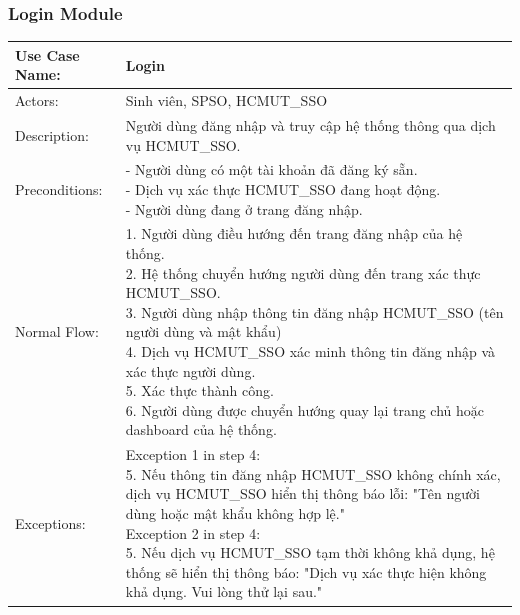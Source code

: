 \subsubsection{Login Module}
\begin{table}[h!]
	\centering
	\begin{tabular}{ |p{4cm}|p{3cm}|p{3cm}|p{3cm}|  }
		\hline
		Use Case Name:    & \multicolumn{3}{l|}{Login}                                                                         \\
		\hline
		Actors:           & \multicolumn{3}{p{10cm}|}{Sinh viên, SPSO, HCMUT\_SSO}                                             \\
		\hline
		Description:      & \multicolumn{3}{p{10cm}|}{Người dùng đăng nhập và truy cập hệ thống thông qua dịch vụ HCMUT\_SSO.} \\
		\hline
		Preconditions:    & \multicolumn{3}{p{10cm}|}{
			- Người dùng có một tài khoản đã đăng ký sẵn.\newline
			- Dịch vụ xác thực HCMUT\_SSO đang hoạt động.\newline
			- Người dùng đang ở trang đăng nhập.
		}                                                                                                                      \\
		\hline
		Normal Flow:      & \multicolumn{3}{p{10cm}|}{
			1. Người dùng điều hướng đến trang đăng nhập của hệ thống.\newline
			2. Hệ thống chuyển hướng người dùng đến trang xác thực HCMUT\_SSO.\newline
			3. Người dùng nhập thông tin đăng nhập HCMUT\_SSO (tên người dùng và mật khẩu)\newline
			4. Dịch vụ HCMUT\_SSO xác minh thông tin đăng nhập và xác thực người dùng. \newline
			5. Xác thực thành công.\newline
			6. Người dùng được chuyển hướng quay lại trang chủ hoặc dashboard của hệ thống.
		}                                                                                                                      \\
		\hline
		Exceptions:       & \multicolumn{3}{p{10cm}|}{
			Exception 1 in step 4:\newline
			5. Nếu thông tin đăng nhập HCMUT\_SSO không chính xác, dịch vụ HCMUT\_SSO hiển thị thông báo lỗi:
			"Tên người dùng hoặc mật khẩu không hợp lệ." \newline
			Exception 2 in step 4:\newline
			5. Nếu dịch vụ HCMUT\_SSO tạm thời không khả dụng, hệ thống sẽ hiển thị thông báo: "Dịch vụ xác thực hiện không khả dụng. Vui lòng thử lại sau."
}
\end{tabular}
\end{table}
